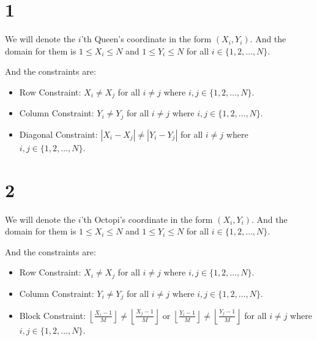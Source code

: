 \documentclass[12pt]{article}
\begin{document}
\subsection{} 
\begin{enumerate}
\part{1} 
	We will denote the $i$'th Queen's coordinate in the form $(X_i, Y_i)$. And the domain for them is $1 \le X_i \le N$ and $1 \le Y_i \le N$ for all $i \in \{1, 2, \dots, N\}$.
	
	And the constraints are:
	
	\begin{itemize}
		\item Row Constraint:
			$X_i \neq X_j $ for all  $i \neq j$ where $i,j \in \{1, 2, \dots, N\}$.
		
		\item Column Constraint:
			$Y_i \neq Y_j $ for all  $i \neq j$ where $i,j \in \{1, 2, \dots, N\}$.
			
		\item Diagonal Constraint: 
			$|X_i - X_j| \neq |Y_i - Y_j| $ for all  $i \neq j$ where $i,j \in \{1, 2, \dots, N\}$.

	\end{itemize}
		
\part{2} 
	We will denote the $i$'th Octopi's coordinate in the form $(X_i, Y_i)$. And the domain for them is $1 \le X_i \le N$ and $1 \le Y_i \le N$ for all $i \in \{1, 2, \dots, N\}$.
	
	And the constraints are:
	
	\begin{itemize}
		\item Row Constraint:
			$X_i \neq X_j $ for all  $i \neq j$ where $i,j \in \{1, 2, \dots, N\}$.
		
		\item Column Constraint:
			$Y_i \neq Y_j $ for all  $i \neq j$ where $i,j \in \{1, 2, \dots, N\}$.
			
		\item Block Constraint: 
			$\left\lfloor \frac{X_i - 1}{M} \right\rfloor \neq \left\lfloor \frac{X_j - 1}{M} \right\rfloor$ or $\left\lfloor \frac{Y_i - 1}{M} \right\rfloor \neq \left\lfloor \frac{Y_j - 1}{M} \right\rfloor$ for all  $i \neq j$ where $i,j \in \{1, 2, \dots, N\}$.


	\end{itemize}


\end{enumerate}

\end{document}
